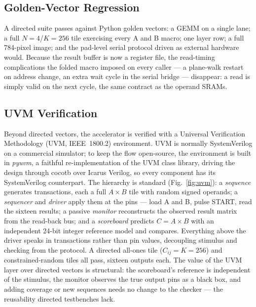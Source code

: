 \documentclass[conference,a4paper]{APSIPA2026}
\begin{document}
\subsection{Golden-Vector Regression}
A directed suite passes against Python golden vectors: a GEMM on a single lane; a full $N{=}4$/$K{=}256$ tile exercising every A and B macro; one layer row; a full 784-pixel image; and the pad-level serial protocol driven as external hardware would. Because the result buffer is now a register file, the read-timing complications the folded macro imposed on every caller --- a plane-walk restart on address change, an extra wait cycle in the serial bridge --- disappear: a read is simply valid on the next cycle, the same contract as the operand SRAMs.

\subsection{UVM Verification}
Beyond directed vectors, the accelerator is verified with a Universal Verification Methodology (UVM, IEEE~1800.2) environment. UVM is normally SystemVerilog on a commercial simulator; to keep the flow open-source, the environment is built in \emph{pyuvm}, a faithful re-implementation of the UVM class library, driving the design through cocotb over Icarus Verilog, so every component has its SystemVerilog counterpart. The hierarchy is standard (Fig.~\ref{fig:uvm}): a \emph{sequence} generates transactions, each a full $A\times B$ tile with random signed operands; a \emph{sequencer} and \emph{driver} apply them at the pins --- load A and B, pulse START, read the sixteen results; a passive \emph{monitor} reconstructs the observed result matrix from the read-back bus; and a \emph{scoreboard} predicts $C=A\times B$ with an independent 24-bit integer reference model and compares. Everything above the driver speaks in transactions rather than pin values, decoupling stimulus and checking from the protocol. A directed all-ones tile ($C_{ij}=K=256$) and constrained-random tiles all pass, sixteen outputs each. The value of the UVM layer over directed vectors is structural: the scoreboard's reference is independent of the stimulus, the monitor observes the true output pins as a black box, and adding coverage or new sequences needs no change to the checker --- the reusability directed testbenches lack.
\end{document}
